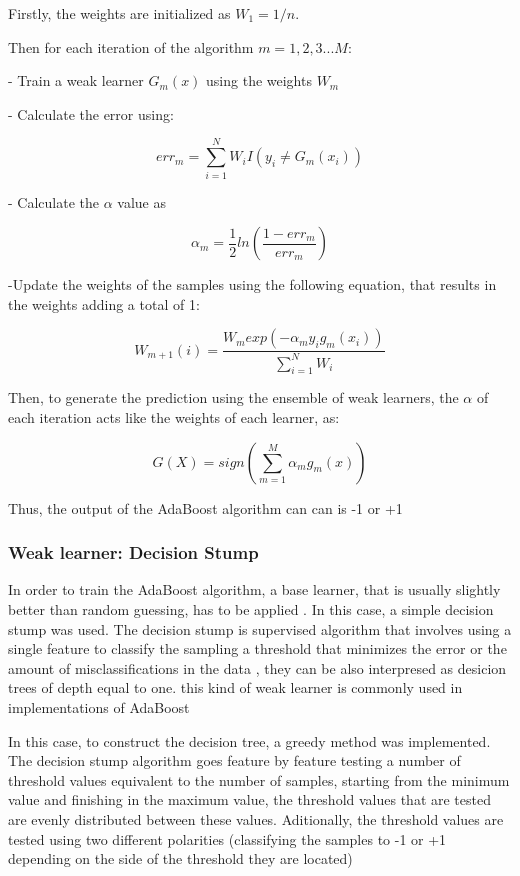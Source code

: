 \documentclass[11pt,twocolumn,letterpaper]{article}
\begin{document}
Firstly, the weights are initialized as $W_1 = 1/n$. 

Then for each iteration of the algorithm $m = 1,2,3...M$:

- Train a weak learner $G_m(x)$ using the weights $W_m$

- Calculate the error using:

\begin{equation}
	err_m = \sum_{i=1}^{N} W_i I(y_i \neq G_m(x_i))
\end{equation}

- Calculate the $\alpha$ value as

\begin{equation}
	\alpha_m = \frac{1}{2}ln(\frac{1-err_m}{err_m})
\end{equation}

-Update the weights of the samples using the following equation, that results in the weights adding  a total of 1:

\begin{equation}
	W_{m+1} (i) = \frac{W_m exp(-\alpha_m y_i g_m(x_i))}{\sum_{i=1}^{N} W_i}
\end{equation}

Then, to generate the prediction using the ensemble of weak learners, the $\alpha$ of each iteration acts like the weights of each learner, as:

\begin{equation}
	G(X) = sign(\sum_{m=1}^{M} \alpha_m g_m(x))
\end{equation}

Thus, the output of the AdaBoost algorithm can can is -1 or +1

\subsubsection{Weak learner: Decision Stump}

In order to train the AdaBoost algorithm, a base learner, that is usually slightly better than random guessing, has to be applied \cite{Freund1999}. In this case, a simple decision stump was used. The decision stump is supervised algorithm that involves using a single feature to classify the sampling a threshold that minimizes the error or the amount of misclassifications in the data \cite{Oliver1994}, they can be also interpresed as desicion trees of depth equal to one. this kind of weak learner is commonly used in implementations of AdaBoost \cite{Hastie2009}

In this case, to construct the decision tree, a greedy method was implemented. The decision stump algorithm goes feature by feature testing a number of threshold values equivalent to the number of samples, starting from the minimum value and finishing in the maximum value, the threshold values that are tested are evenly distributed between these values. Aditionally, the threshold values are tested using two different polarities (classifying the samples to -1 or +1 depending on the side of the threshold they are located)
\end{document}
